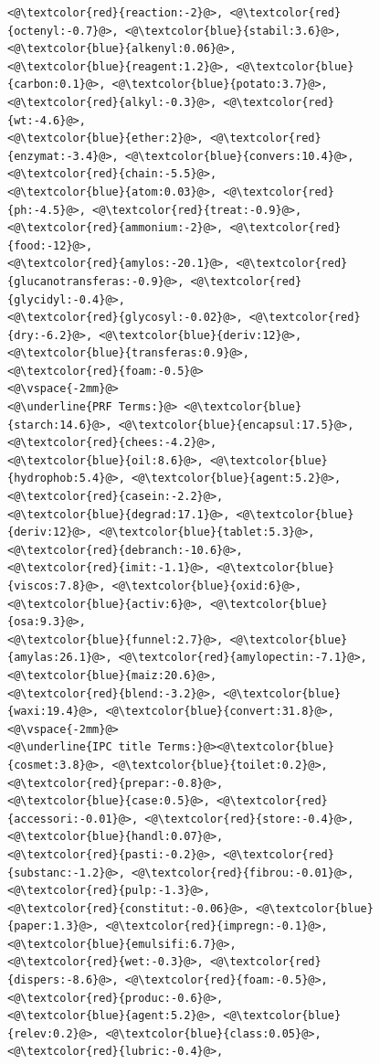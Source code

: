 \begin{figure}[t!]
\begin{framed}
\begin{lstlisting}[basicstyle=\scriptsize\ttfamily , linewidth=\columnwidth,breaklines=true]
<@\textcolor{red}{reaction:-2}@>, <@\textcolor{red}{octenyl:-0.7}@>, <@\textcolor{blue}{stabil:3.6}@>, <@\textcolor{blue}{alkenyl:0.06}@>, 
<@\textcolor{blue}{reagent:1.2}@>, <@\textcolor{blue}{carbon:0.1}@>, <@\textcolor{blue}{potato:3.7}@>, <@\textcolor{red}{alkyl:-0.3}@>, <@\textcolor{red}{wt:-4.6}@>, 
<@\textcolor{blue}{ether:2}@>, <@\textcolor{red}{enzymat:-3.4}@>, <@\textcolor{blue}{convers:10.4}@>, <@\textcolor{red}{chain:-5.5}@>, 
<@\textcolor{blue}{atom:0.03}@>, <@\textcolor{red}{ph:-4.5}@>, <@\textcolor{red}{treat:-0.9}@>, <@\textcolor{red}{ammonium:-2}@>, <@\textcolor{red}{food:-12}@>, 
<@\textcolor{red}{amylos:-20.1}@>, <@\textcolor{red}{glucanotransferas:-0.9}@>, <@\textcolor{red}{glycidyl:-0.4}@>, 
<@\textcolor{red}{glycosyl:-0.02}@>, <@\textcolor{red}{dry:-6.2}@>, <@\textcolor{blue}{deriv:12}@>, <@\textcolor{blue}{transferas:0.9}@>, 
<@\textcolor{red}{foam:-0.5}@>
<@\vspace{-2mm}@>
<@\underline{PRF Terms:}@> <@\textcolor{blue}{starch:14.6}@>, <@\textcolor{blue}{encapsul:17.5}@>, <@\textcolor{red}{chees:-4.2}@>, 
<@\textcolor{blue}{oil:8.6}@>, <@\textcolor{blue}{hydrophob:5.4}@>, <@\textcolor{blue}{agent:5.2}@>, <@\textcolor{red}{casein:-2.2}@>, 
<@\textcolor{blue}{degrad:17.1}@>, <@\textcolor{blue}{deriv:12}@>, <@\textcolor{blue}{tablet:5.3}@>, <@\textcolor{red}{debranch:-10.6}@>, 
<@\textcolor{red}{imit:-1.1}@>, <@\textcolor{blue}{viscos:7.8}@>, <@\textcolor{blue}{oxid:6}@>, <@\textcolor{blue}{activ:6}@>, <@\textcolor{blue}{osa:9.3}@>, 
<@\textcolor{blue}{funnel:2.7}@>, <@\textcolor{blue}{amylas:26.1}@>, <@\textcolor{red}{amylopectin:-7.1}@>, <@\textcolor{blue}{maiz:20.6}@>, 
<@\textcolor{red}{blend:-3.2}@>, <@\textcolor{blue}{waxi:19.4}@>, <@\textcolor{blue}{convert:31.8}@>, 
<@\vspace{-2mm}@>
<@\underline{IPC title Terms:}@><@\textcolor{blue}{cosmet:3.8}@>, <@\textcolor{blue}{toilet:0.2}@>, <@\textcolor{red}{prepar:-0.8}@>, 
<@\textcolor{blue}{case:0.5}@>, <@\textcolor{red}{accessori:-0.01}@>, <@\textcolor{red}{store:-0.4}@>, <@\textcolor{blue}{handl:0.07}@>, 
<@\textcolor{red}{pasti:-0.2}@>, <@\textcolor{red}{substanc:-1.2}@>, <@\textcolor{red}{fibrou:-0.01}@>, <@\textcolor{red}{pulp:-1.3}@>, 
<@\textcolor{red}{constitut:-0.06}@>, <@\textcolor{blue}{paper:1.3}@>, <@\textcolor{red}{impregn:-0.1}@>, <@\textcolor{blue}{emulsifi:6.7}@>, 
<@\textcolor{red}{wet:-0.3}@>, <@\textcolor{red}{dispers:-8.6}@>, <@\textcolor{red}{foam:-0.5}@>, <@\textcolor{red}{produc:-0.6}@>, 
<@\textcolor{blue}{agent:5.2}@>, <@\textcolor{blue}{relev:0.2}@>, <@\textcolor{blue}{class:0.05}@>, <@\textcolor{red}{lubric:-0.4}@>, 

\end{lstlisting}
\end{framed}
\end{figure}
